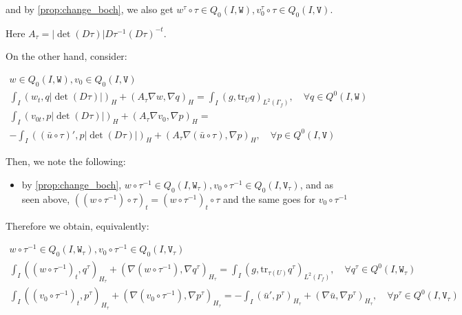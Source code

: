 \documentclass[english,a4paper,10pt,oneside]{scrbook}	%
\theoremstyle{break}
\theoremstyle{remark}
\newcommand{\tr}{\text{tr}}
\newcommand{\tred}[1]{\textcolor{red}{#1}}
\newcommand{\tw}[1]{\texttt{#1}}
\begin{document}
\begin{appendices}
and by \cref{prop:change_boch}, we also get $w^\tau\circ \tau \in Q_0(I,\tw{W}), v_0^\tau\circ \tau \in Q_0(I,\tw{V})$.

Here $A_\tau = |\det(D\tau)|D\tau^{-1}(D\tau)^{-t}$.



On the other hand, consider:

\begin{align*}
w \in Q_0(I, \tw{W}), v_0 \in Q_0(I,\tw{V}) \\
\int_I ( w_t , q |\det(D\tau)|)_H+ (A_\tau\nabla w, \nabla q)_{H} =\int_I(g,\tr_{U} q)_{L^2(\Gamma_f)}, \quad \forall q \in Q^0(I, \tw{W}) \\
\int_I ( v_{0t},p |\det(D\tau)|)_H + (A_\tau \nabla v_0, \nabla p)_{H}=\\ -\int_I((\bar{u}\circ \tau)',p|\det(D\tau)|)_{H}+(A_\tau \nabla (\bar{u} \circ \tau), \nabla p)_{H}, \quad \forall p \in Q^0(I, \tw{V})
\end{align*}

Then, we note the following:

\begin{itemize}
	\item by \cref{prop:change_boch}, $w\circ \tau^{-1} \in Q_0(I, \tw{W}_\tau), v_0\circ \tau^{-1} \in Q_0(I,\tw{V}_\tau) $, and as seen above, $((w\circ \tau^{-1})\circ \tau)_t = (w\circ \tau^{-1})_t\circ \tau$ and the same goes for $v_0\circ \tau^{-1}$
\end{itemize}

Therefore we obtain, equivalently:

\begin{align*}
w\circ \tau^{-1} \in Q_0(I, \tw{W}_\tau), v_0\circ \tau^{-1} \in Q_0(I,\tw{V}_\tau) \\
\int_I ((w\circ \tau^{-1})_t , q^\tau)_{H_\tau}+ (\nabla (w\circ \tau^{-1}), \nabla q^\tau)_{H_\tau} = \int_I(g,\tr_{\tau(U)} q^\tau)_{L^2(\Gamma_f)}, \quad \forall q^\tau \in Q^0(I, \tw{W}_\tau) \\
\int_I ((v_0\circ \tau^{-1})_t,p^\tau)_{H_\tau} + (\nabla (v_0\circ \tau^{-1}), \nabla p^\tau)_{H_\tau}= -\int_I(\bar{u}',p^\tau)_{H_\tau}+(\nabla \bar{u}, \nabla p^\tau)_{H_\tau}, \quad \forall p^\tau \in Q^0(I, \tw{V}_\tau)
\end{align*}


\end{appendices}
\end{document}
